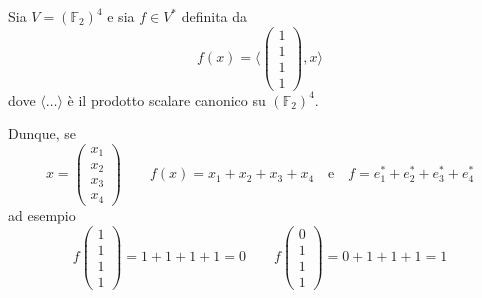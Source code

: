 \documentclass[../main.tex]{subfiles}
\begin{document}
\begin{example}
    Sia $V = (\mathbb{F}_2)^4$ e sia $f \in V^*$ definita da
    \begin{equation*}
        f(x) = \langle\begin{pmatrix}
            1 \\
            1 \\
            1 \\
            1
        \end{pmatrix}, x \rangle
    \end{equation*}
    dove $\langle \ldots \rangle$ è il prodotto scalare canonico su $(\mathbb{F}_2)^4$.

    Dunque, se
    \begin{equation*}
        x = \begin{pmatrix}
            x_1 \\
            x_2 \\
            x_3 \\
            x_4
        \end{pmatrix} \qquad f(x) = x_1 + x_2 + x_3 + x_4 \quad \text{e} \quad f = e^*_1 + e^*_2 + e^*_3 + e^*_4
    \end{equation*}
    ad esempio
    \begin{equation*}
        f\begin{pmatrix}
            1 \\
            1 \\
            1 \\
            1
        \end{pmatrix} = 1 + 1 + 1 + 1 = 0 \qquad
        f\begin{pmatrix}
            0 \\
            1 \\
            1 \\
            1
        \end{pmatrix} = 0 + 1 + 1 + 1 = 1
    \end{equation*}
\end{example}
\end{document}
